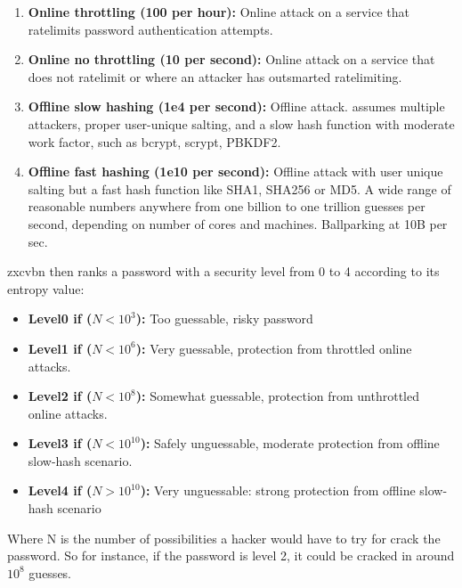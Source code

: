 \begin{enumerate}
\setlength\itemsep{-3pt}


\item \textbf{Online throttling (100 per hour):} Online attack on a service that ratelimits password authentication  attempts.
  
\item \textbf{Online no throttling (10 per second): }Online attack on a service that does not ratelimit or where an attacker has outsmarted ratelimiting.

\item \textbf{Offline slow hashing (1e4 per second): }Offline attack. assumes multiple attackers, proper user-unique salting, and a slow hash function with moderate work factor, such as bcrypt, scrypt, PBKDF2.

\item \textbf{Offline fast hashing (1e10 per second): }Offline attack with user unique salting but a fast hash function like SHA1, SHA256 or MD5. A wide range of reasonable numbers anywhere from one billion to one trillion guesses per second, depending on number of cores and machines. Ballparking at 10B per sec.

\end{enumerate}

%
%
%
%

zxcvbn then ranks a password with a security level from 0 to 4 according to its entropy value:
\begin{itemize}
\setlength\itemsep{-3pt}

\item \textbf{Level0 if ($N<10^{3}$):} Too guessable, risky password
\item \textbf{Level1 if ($N<10^{6}$):} Very guessable, protection from throttled online attacks.
\item \textbf{Level2 if ($N<10^{8}$):} Somewhat guessable, protection from unthrottled online attacks.
\item \textbf{Level3 if ($N<10^{10}$):} Safely unguessable, moderate protection from offline slow-hash scenario.
\item \textbf{Level4 if ($N>10^{10}$):} Very unguessable: strong protection from offline slow-hash scenario

\end{itemize}
Where N is the number of possibilities a hacker would have to try for crack the password. So for instance, if the password is level 2, it could be cracked in around $10^{8}$ guesses.

